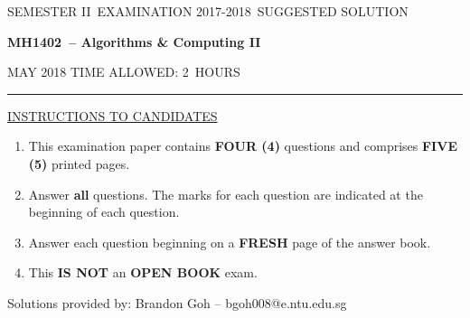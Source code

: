\documentclass[12pt]{article}
\newcommand{\masunitnumber}{MH1402}
\newcommand{\examdate}{MAY 2018}
\newcommand{\academicyear}{2017-2018}
\newcommand{\semester}{II}
\newcommand{\coursename}{Algorithms \& Computing II}
\newcommand{\numberofhours}{2}
\begin{document}
\setlength{\headsep}{5truemm}
\setlength{\headheight}{14.5truemm}
\setlength{\voffset}{-0.45truein}
\renewcommand{\headrulewidth}{0.0pt}
\begin{center}
SEMESTER \semester\ EXAMINATION \academicyear ~SUGGESTED SOLUTION
\end{center}
\begin{center}
{\bf \masunitnumber\ -- \coursename}
\end{center}
\vspace{20truemm}

\noindent \examdate\hspace{55truemm} TIME ALLOWED: \numberofhours\ HOURS

\vspace{19truemm}
\hrule
\vspace{19truemm}
\noindent\underline{INSTRUCTIONS TO CANDIDATES}
\vspace{8truemm}
\begin{enumerate}
\item This examination paper contains {\bf FOUR (4)} questions and comprises 
{\bf FIVE (5)} printed pages.

\item Answer \textbf{all} questions. 
The marks for each question are indicated at the beginning of each question.


\item Answer each question beginning on a {\bf FRESH} page of the answer book.

\item This {\bf IS NOT} an {\bf OPEN BOOK} exam.

\end{enumerate}

\newpage
\lhead{}
\rhead{\masunitnumber}
\chead{}
\lfoot{}
\cfoot{\thepage}
\rfoot{}
\setlength{\footskip}{45pt}
\noindent Solutions provided by:
Brandon Goh -- bgoh008@e.ntu.edu.sg
\end{document}
